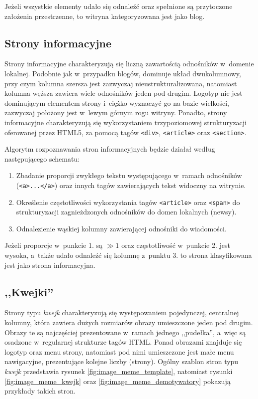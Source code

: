 \documentclass[a4paper,10pt]{article}
\begin{document}
\noindent Jeżeli wszystkie elementy udało się odnaleźć oraz spełnione są przytoczone założenia przestrzenne, to witryna kategoryzowana jest jako blog.

\subsection*{Strony informacyjne}

Strony informacyjne charakteryzują się liczną zawartością odnośników w~domenie lokalnej. Podobnie jak w~przypadku blogów, dominuje układ dwukolumnowy, przy czym kolumna szersza jest zazwyczaj nieustrukturalizowana, natomiast kolumna węższa zawiera wiele odnośników jeden pod drugim. Logotyp nie jest dominującym elementem strony i~ciężko wyznaczyć go na bazie wielkości, zazwyczaj położony jest w~lewym górnym rogu witryny. Ponadto, strony informacyjne charakteryzują się wykorzystaniem trzypoziomowej strukturyzacji oferowanej przez HTML5, za pomocą tagów \verb+<div>+, \verb+<article>+ oraz \verb+<section>+.

Algorytm rozpoznawania stron informacyjnych będzie działał według następującego schematu:

\begin{enumerate}
 \item Zbadanie proporcji zwykłego tekstu występującego w~ramach odnośników (\verb+<a>...</a>+) oraz innych tagów zawierających tekst widoczny na witrynie.
 \item Określenie częstotliwości wykorzystania tagów \verb+<article>+ oraz \verb+<span>+ do strukturyzacji zagnieżdzonych odnośników do domen lokalnych (newsy).
 \item Odnalezienie wąskiej kolumny zawierającej odnośniki do wiadomości.
\end{enumerate}

Jeżeli proporcje w~punkcie 1. są $\gg 1$ oraz częstotliwość w~punkcie 2. jest wysoka, a~także udało odnaleźć się kolumnę z~punktu 3. to strona klasyfikowana jest jako strona informacyjna.

\subsection*{,,Kwejki''}

Strony typu \emph{kwejk} charakteryzują się występowaniem pojedynczej, centralnej kolumny, która zawiera dużych rozmiarów obrazy umieszczone jeden pod drugim. Obrazy te są najczęściej prezentowane w~ramach jednego ,,pudełka'', a~więc są osadzone w~regularnej strukturze tagów HTML. Ponad obrazami znajduje się logotyp oraz menu strony, natomiast pod nimi umieszczone jest małe menu nawigacyjne, prezentujące kolejne liczby (strony). Ogólny szablon stron typu \emph{kwejk} przedstawia rysunek \ref{fig:image_meme_template}, natomiast rysunki \ref{fig:image_meme_kwejk} oraz \ref{fig:image_meme_demotywatory} pokazują przykłady takich stron.
\end{document}
